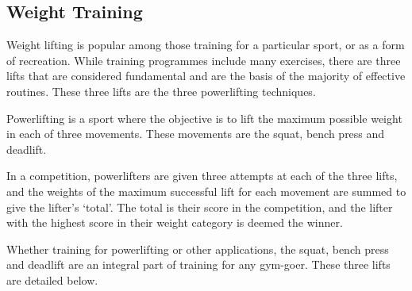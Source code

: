 \subsection{Weight Training}

Weight lifting is popular among those training for a particular sport, or as a form of recreation. While training programmes include many exercises, there are three lifts that are considered fundamental and are the basis of the majority of effective routines. These three lifts are the three powerlifting techniques.

Powerlifting is a sport where the objective is to lift the maximum possible weight in each of three movements. These movements are the squat, bench press and deadlift.

In a competition, powerlifters are given three attempts at each of the three lifts, and the weights of the maximum successful lift for each movement are summed to give the lifter’s `total'. The total is their score in the competition, and the lifter with the highest score in their weight category is deemed the winner.

Whether training for powerlifting or other applications, the squat, bench press and deadlift are an integral part of training for any gym-goer. These three lifts are detailed below.





